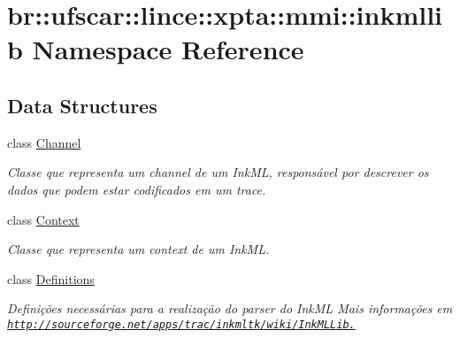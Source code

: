 \hypertarget{namespacebr_1_1ufscar_1_1lince_1_1xpta_1_1mmi_1_1inkmllib}{
\section{br::ufscar::lince::xpta::mmi::inkmllib Namespace Reference}
\label{namespacebr_1_1ufscar_1_1lince_1_1xpta_1_1mmi_1_1inkmllib}
}
\subsection*{Data Structures}
\begin{DoxyCompactItemize}
\item 
class \hyperlink{classbr_1_1ufscar_1_1lince_1_1xpta_1_1mmi_1_1inkmllib_1_1Channel}{Channel}
\begin{DoxyCompactList}\small\item\em Classe que representa um channel de um InkML, responsável por descrever os dados que podem estar codificados em um trace. \item\end{DoxyCompactList}\item 
class \hyperlink{classbr_1_1ufscar_1_1lince_1_1xpta_1_1mmi_1_1inkmllib_1_1Context}{Context}
\begin{DoxyCompactList}\small\item\em Classe que representa um context de um InkML. \item\end{DoxyCompactList}\item 
class \hyperlink{classbr_1_1ufscar_1_1lince_1_1xpta_1_1mmi_1_1inkmllib_1_1Definitions}{Definitions}
\begin{DoxyCompactList}\small\item\em Definições necessárias para a realização do parser do InkML Mais informações em \href{http://sourceforge.net/apps/trac/inkmltk/wiki/InkMLLib.}{\tt http://sourceforge.net/apps/trac/inkmltk/wiki/InkMLLib.} \item\end{DoxyCompactList}\end{DoxyCompactItemize}

